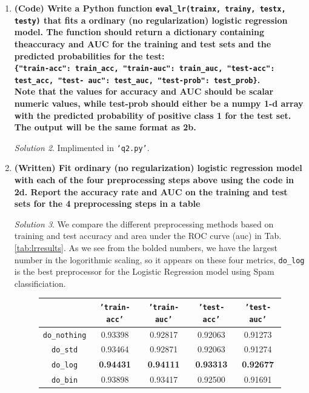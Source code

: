 \documentclass[a4paper,12pt]{article}
\theoremstyle{definition}
\theoremstyle{remark}
\newtheorem*{solution}{Solution}
\begin{document}
\begin{enumerate}
\begin{enumerate}
\begin{solution}
			\end{solution}
			\item {\bf(Code) Write a Python function \texttt{eval\_lr(trainx, trainy, testx, testy)} that fits a ordinary (no regularization) logistic regression model. The function should return a dictionary containing theaccuracy and AUC for the training and test sets and the predicted probabilities for the test: \\
				
				\texttt{\{"train-acc": train\_acc, "train-auc": train\_auc, "test-acc": test\_acc, "test-
					auc": test\_auc, "test-prob": test\_prob\}}.\\
				 Note that the values for accuracy and AUC should be scalar numeric values, while test-prob should either be a numpy 1-d array with the predicted probability of positive class 1 for the test set. The output will be the same format as 2b.}
			\begin{solution}
					Implimented in \texttt{`q2.py'}.
			\end{solution}
			\item {\bf(Written) Fit ordinary (no regularization) logistic regression model with each of the four preprocessing steps above using the code in 2d. Report the accuracy rate and AUC on the training and test sets for the 4 preprocessing steps in a table}
			\begin{solution}
				We compare the different preprocessing methods based on training and test accuracy and area under the ROC curve (auc) in Tab.  \ref{tab:lrresults}. As we see from the bolded numbers, we have the largest number in the logorithmic scaling, so it appears on these four metrics, \texttt{do\_log} is the best preprocessor for the Logistic Regression model using Spam classificiation.
				\begin{figure}[h]
					\centering
					\begin{tabular}{|c|cccc|}
						\hline
						&  \texttt{'train-acc'}&\texttt{'train-auc'}  & \texttt{'test-acc'} &  \texttt{'test-auc'}\\
						\hline\hline
						\texttt{do\_nothing}& 0.93398& 0.92817& 0.92063& 0.91273 \\
						\texttt{do\_std}& 0.93464& 0.92871& 0.92063&0.91274 \\
						\texttt{do\_log}&{\bf0.94431}& {\bf0.94111}&{\bf0.93313}&{\bf0.92677}\\
						\texttt{do\_bin}& 0.93898& 0.93417&0.92500& 0.91691\\
						\hline
					\end{tabular}

\end{figure}
\end{solution}
\end{enumerate}
\end{enumerate}
\end{document}
